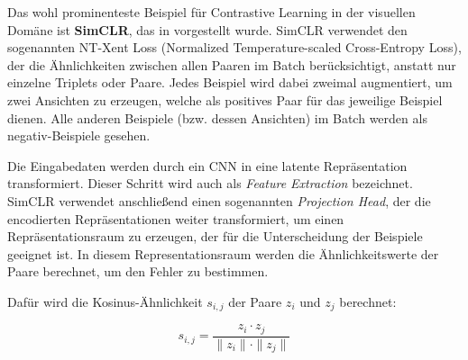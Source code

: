Das wohl prominenteste Beispiel für Contrastive Learning in der visuellen Domäne ist \textbf{SimCLR}, das in \parencite{Chen2020simclr} vorgestellt wurde. SimCLR verwendet den sogenannten NT-Xent Loss (Normalized Temperature-scaled Cross-Entropy Loss), der die Ähnlichkeiten zwischen allen Paaren im Batch berücksichtigt, anstatt nur einzelne Triplets oder Paare. Jedes Beispiel wird dabei zweimal augmentiert, um zwei Ansichten zu erzeugen, welche als positives Paar für das jeweilige Beispiel dienen. Alle anderen Beispiele (bzw. dessen Ansichten) im Batch werden als negativ-Beispiele gesehen.

Die Eingabedaten werden durch ein CNN in eine latente Repräsentation transformiert. Dieser Schritt wird auch als \textit{Feature Extraction} bezeichnet. SimCLR verwendet anschließend einen sogenannten \textit{Projection Head}, der die encodierten Repräsentationen weiter transformiert, um einen Repräsentationsraum zu erzeugen, der für die Unterscheidung der Beispiele geeignet ist. In diesem Representationsraum werden die Ähnlichkeitswerte der Paare berechnet, um den Fehler zu bestimmen.

Dafür wird die Kosinus-Ähnlichkeit $s_{i,j}$ der Paare $z_i$ und $z_j$ berechnet:

\begin{equation}
	s_{i,j} = \frac{z_i \cdot z_j}{\|z_i\| \cdot \|z_j\|}
	\label{eq:cosine-similarity}
\end{equation}

